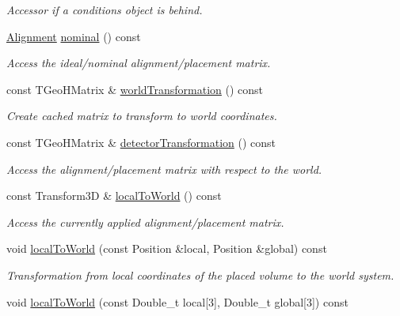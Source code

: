 \begin{DoxyCompactItemize}
\begin{DoxyCompactList}\small\item\em Accessor if a conditions object is behind. \end{DoxyCompactList}\item 
\hyperlink{class_d_d4hep_1_1_alignments_1_1_alignment}{Alignment} \hyperlink{class_d_d4hep_1_1_alignments_1_1_alignment_data_a1ad26965bc90bc605a93cbee82e9e773}{nominal} () const
\begin{DoxyCompactList}\small\item\em Access the ideal/nominal alignment/placement matrix. \end{DoxyCompactList}\item 
const T\+Geo\+H\+Matrix \& \hyperlink{class_d_d4hep_1_1_alignments_1_1_alignment_data_a2968ca6560efa496170adacb25f1c476}{world\+Transformation} () const
\begin{DoxyCompactList}\small\item\em Create cached matrix to transform to world coordinates. \end{DoxyCompactList}\item 
const T\+Geo\+H\+Matrix \& \hyperlink{class_d_d4hep_1_1_alignments_1_1_alignment_data_a0f974ebbad82f5f6af363063b65314d9}{detector\+Transformation} () const
\begin{DoxyCompactList}\small\item\em Access the alignment/placement matrix with respect to the world. \end{DoxyCompactList}\item 
const Transform3D \& \hyperlink{class_d_d4hep_1_1_alignments_1_1_alignment_data_af24ecc77fdd725d3ab6a76848594fa95}{local\+To\+World} () const
\begin{DoxyCompactList}\small\item\em Access the currently applied alignment/placement matrix. \end{DoxyCompactList}\item 
void \hyperlink{class_d_d4hep_1_1_alignments_1_1_alignment_data_a7e4879bde9e295fcfeb209c9dd721691}{local\+To\+World} (const Position \&local, Position \&global) const
\begin{DoxyCompactList}\small\item\em Transformation from local coordinates of the placed volume to the world system. \end{DoxyCompactList}\item 
void \hyperlink{class_d_d4hep_1_1_alignments_1_1_alignment_data_aa8538578c348c8324770fbdef86c45fb}{local\+To\+World} (const Double\+\_\+t local\mbox{[}3\mbox{]}, Double\+\_\+t global\mbox{[}3\mbox{]}) const

\end{DoxyCompactItemize}
